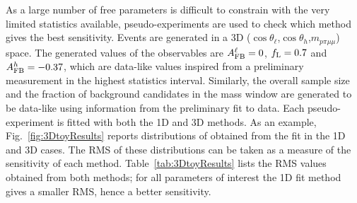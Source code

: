 As a large number of free parameters is difficult to constrain with the very limited statistics available, 
%
pseudo-experiments are used to check which method gives the best sensitivity.
Events are generated in a 3D ($\cos\theta_\ell$,$\cos\theta_h$,$m_{p\pi\mu\mu}$) space.
The generated values of the observables are $A_{\rm FB}^\ell = 0$, $f_{\rm L} = 0.7$ 
and $A_{\rm FB}^h = -0.37$, which are data-like values inspired from a preliminary measurement
in the highest statistics \qsq interval. Similarly, the overall sample size and the fraction of background candidates
in the mass window are generated to be data-like using information from the preliminary fit to data.
%
Each pseudo-experiment is fitted with both the 1D and 3D methods. As an example, Fig.~\ref{fig:3DtoyResults} 
reports distributions of \afbl obtained from the fit in the 1D and 3D cases.
The RMS of these distributions can be taken as a measure of the sensitivity of each method.
Table~\ref{tab:3DtoyResults} lists the RMS values obtained from both methods; for all parameters 
of interest the 1D fit method gives a smaller RMS, hence a better sensitivity.
%
\begin{table}[hb]
\centering
\caption{RMS values for pseudo-experiments on the extraction of the three parameters
of interests with the 1D and 3D fitting methods.}
\label{tab:3DtoyResults}
\end{table}

